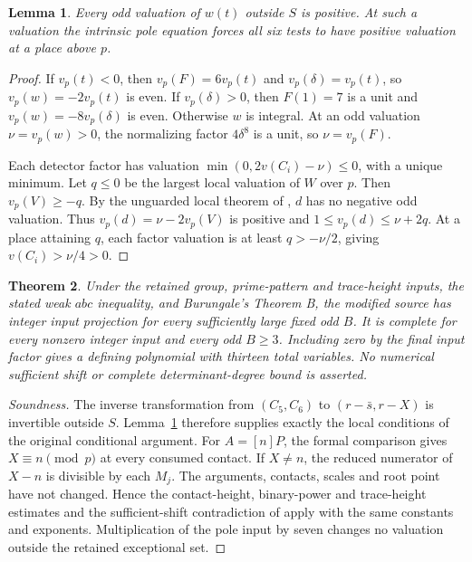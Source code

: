 \documentclass[11pt,a4paper]{article}
\newtheorem{theorem}{Theorem}[section]
\newtheorem{lemma}[theorem]{Lemma}
\begin{document}
\begin{lemma}\label{lem:odd}
Every odd valuation of $w(t)$ outside $S$ is positive. At such a
valuation the intrinsic pole equation forces all
six tests to have positive valuation at a place above $p$.
\end{lemma}
\begin{proof}
If $v_p(t)<0$, then $v_p(F)=6v_p(t)$ and $v_p(\delta)=v_p(t)$,
so $v_p(w)=-2v_p(t)$ is even. If $v_p(\delta)>0$, then
$F(1)=7$ is a unit and $v_p(w)=-8v_p(\delta)$ is even.
Otherwise $w$ is integral. At an odd valuation $\nu=v_p(w)>0$,
the normalizing factor $4\delta^8$ is a unit, so $\nu=v_p(F)$.

Each detector factor has valuation $\min(0,2v(C_i)-\nu)\le0$,
with a unique minimum. Let $q\le0$ be the largest local valuation
of $W$ over $p$. Then $v_p(V)\ge-q$. By the unguarded local
theorem of \cite{Intrinsic}, $d$ has no negative odd valuation.
Thus $v_p(d)=\nu-2v_p(V)$ is positive and
$1\le v_p(d)\le\nu+2q$. At a place attaining $q$, each factor
valuation is at least $q>-\nu/2$, giving $v(C_i)>\nu/4>0$.
\end{proof}

\begin{theorem}\label{thm:main}
Under the retained group, prime-pattern and trace-height inputs, the
stated weak $abc$ inequality, and Burungale's Theorem B, the modified
source has integer input projection for every sufficiently large
fixed odd $B$. It is complete for every nonzero integer input and
every odd $B\ge3$. Including zero by the final input factor gives a
defining polynomial with thirteen total variables. No numerical
sufficient shift or complete determinant-degree bound is asserted.
\end{theorem}
\begin{proof}[Soundness]
The inverse transformation from $(C_5,C_6)$ to
$(r-\bar s,r-X)$ is invertible outside $S$. Lemma~\ref{lem:odd}
therefore supplies exactly the local conditions of the original
conditional argument. For $A=[n]P$, the formal comparison gives
$X\equiv n\pmod p$ at every consumed contact. If $X\ne n$, the
reduced numerator of $X-n$ is divisible by each $M_j$.
The arguments, contacts, scales and root point have not changed.
Hence the contact-height, binary-power and trace-height estimates and
the sufficient-shift contradiction of \cite{Conditional} apply with
the same constants and exponents. Multiplication of the pole input
by seven changes no valuation outside the retained exceptional set.
\end{proof}
\end{document}
